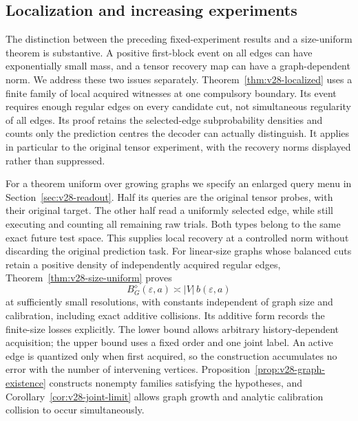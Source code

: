 \subsection{Localization and increasing experiments}
The distinction between the preceding fixed-experiment results and a
size-uniform theorem is substantive. A positive first-block event on
all edges can have exponentially small mass, and a tensor recovery map
can have a graph-dependent norm. We address these two issues separately.
Theorem~\ref{thm:v28-localized} uses a finite family of local acquired
witnesses at one compulsory boundary. Its event requires enough regular
edges on every candidate cut, not simultaneous regularity of all edges.
Its proof retains the selected-edge subprobability densities and counts
only the prediction centres the decoder can actually distinguish.
It applies in particular to the original tensor experiment, with the
recovery norms displayed rather than suppressed.

For a theorem uniform over growing graphs we specify an enlarged query
menu in Section~\ref{sec:v28-readout}. Half its queries are the original
tensor probes, with their original target. The other half read a
uniformly selected edge, while still executing and counting all remaining
raw trials. Both types belong to the same exact future test space.
This supplies local recovery at a controlled norm without discarding
the original prediction task. For linear-size graphs whose balanced
cuts retain a positive density of independently acquired regular edges,
Theorem~\ref{thm:v28-size-uniform} proves
\[
                  B_G^\diamond(\varepsilon,a)
                            \asymp |V|\,b(\varepsilon,a)
\]
at sufficiently small resolutions, with constants independent of graph
size and calibration, including exact additive collisions. Its additive
form records the finite-size losses explicitly. The lower bound allows
arbitrary history-dependent acquisition; the upper bound uses a
fixed order and one joint label. An active edge is quantized only when
first acquired, so the construction accumulates no error with the
number of intervening vertices. Proposition~\ref{prop:v28-graph-existence}
constructs nonempty families satisfying the hypotheses, and
Corollary~\ref{cor:v28-joint-limit} allows graph growth and analytic
calibration collision to occur simultaneously.

